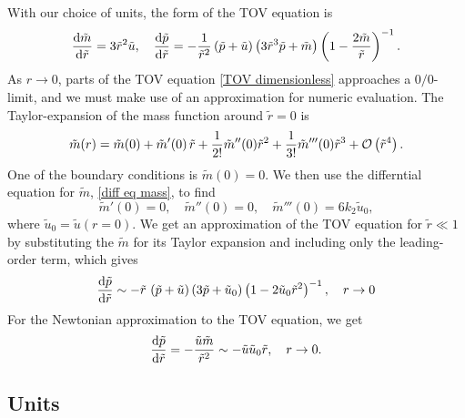 With our choice of units, the form of the TOV equation is
%
\begin{align}
    \odv{\tilde m}{\tilde r} 
    = 3 \tilde r^2 \tilde u, \quad
    \odv{\tilde p}{\tilde r} 
     = - \frac{1}{\tilde r^2} \left(\tilde p + \tilde u\right) 
    \left(3  \tilde r^3 \tilde p + \tilde m\right) 
    \left(1 - \frac{2 \tilde m}{\tilde r}\right)^{-1}.
\end{align}
%
As $r \rightarrow 0$, parts of the TOV equation \autoref{TOV dimensionless} approaches a $0/0$-limit, and we must make use of an approximation for numeric evaluation.
The Taylor-expansion of the mass function around $\tilde r = 0$ is
%
\begin{equation}
    \tilde m(r) = \tilde m(0) + \tilde m'(0) \, \tilde r + \frac{1}{2!} \tilde m''(0) \tilde r^2
    + \frac{1}{3!} \tilde m'''(0) \tilde r^3 + \mathcal O\left(\tilde r^4\right).
\end{equation}
%
One of the boundary conditions is $\tilde m(0) = 0$.
We then use the differntial equation for $\tilde m$, \autoref{diff eq mass}, to find
%
\begin{equation}
    \tilde m'(0) = 0, \quad
    \tilde m''(0) = 0, \quad
    \tilde m'''(0) = 6 k_2 \tilde u_0,
\end{equation}
%
where $\tilde u_0 = \tilde u(r = 0)$.
We get an approximation of the TOV equation for $\tilde r \ll 1$ by substituting the $\tilde m$ for its Taylor expansion and including only the leading-order term, which gives
%
\begin{equation}
    \odv{\tilde p}{\tilde r}
    \sim - \tilde r \, \left(\tilde p + \tilde u\right)
    \left( 3 \tilde p + \tilde u_0  \right)
    \left(1 - 2 \tilde u_0 \tilde r^2\right)^{-1}, \quad r\rightarrow 0
\end{equation}
%
For the Newtonian approximation to the TOV equation, we get
%
\begin{equation}
    \odv{\tilde p}{\tilde r} = -\frac{\tilde u \tilde m}{\tilde r^2}
    \sim - \tilde u \tilde u_0 \tilde r,  \quad r\rightarrow 0.
\end{equation}



\subsection{Units}

